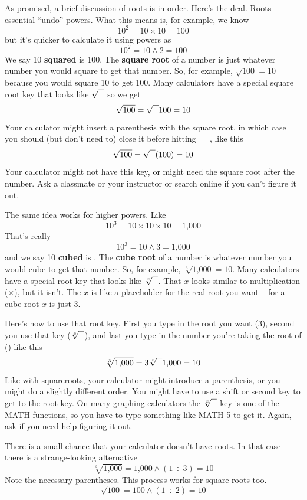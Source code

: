 As promised, a brief discussion of roots is in order.  
Here's the deal.  Roots essential ``undo'' powers.  What this means is, for example, we know $$10^2=10 \times 10 =100$$  but it's quicker to calculate it using powers as $$10^2 = 10 \wedge 2 = 100$$  We say 10 \textbf{squared} is 100.  The \textbf{square root} of a number is just whatever number you would square to get that number.  So, for example, $\sqrt{100} = 10$ because you would square 10 to get 100.  Many calculators have a special square root key that looks like $\sqrt{\text{\raisebox{.6em}{~\text{  }}}} $ so we get 
$$\sqrt{100} = \sqrt{\text{\raisebox{.6em}{~\text{  }}}} 100 = 10$$  
Your calculator might insert a parenthesis with the square root, in which case you should (but don't need to) close it before hitting $=$, like this
$$\sqrt{100} = \sqrt{\text{\raisebox{.6em}{~\text{  }}}} ( 100 ) = 10$$ 
Your calculator might not have this key, or might need the square root after the number.  Ask a classmate or your instructor or search online if you can't figure it out.

The same idea works for higher powers.  Like $$10^3 =10 \times 10 \times 10 = \text{1,000}$$ That's really  $$10^3 = 10 \wedge 3 = \text{1,000}$$ and we say
10 \textbf{cubed} is .  The \textbf{cube root} of a number is whatever number you would cube to get that number.  So, for example, $\sqrt[3]{\text{1,000}} = 10$.  Many calculators have a special root key that looks like $\sqrt[x]{\text{\raisebox{.6em}{~\text{  }}}} $.  That $x$ looks similar to multiplication ($\times$), but it isn't.  The $x$ is like a placeholder for the real root you want -- for a cube root $x$ is just 3.  

Here's how to use that root key. First you type in the root you want (3), second you use that key ($\sqrt[x]{\text{\raisebox{.6em}{~\text{  }}}} $), and last you type in the number you're taking the root of () like this
$$\sqrt[3]{\text{1,000}} = 3\sqrt[x]{\text{\raisebox{.6em}{~\text{  }}}}\text{1,000}= 10$$
Like with squareroots, your calculator might introduce a parenthesis, or you might do a slightly different order.  You might have to use a shift or second key to get to the root key.  On many graphing calculators the $\sqrt[x]{\text{\raisebox{.6em}{~\text{  }}}} $ key is one of the MATH functions, so you have to type something like MATH 5 to get it.  Again, ask if you need help figuring it out.  

There is a small chance that your calculator doesn't have roots.  In that case there is a strange-looking alternative
$$\sqrt[3]{\text{1,000}} = \text{1,000} \wedge (1 \div 3)= 10$$
Note the necessary parentheses. This process works for square roots too.
$$\sqrt{100} = \text{100} \wedge (1 \div 2)= 10$$

